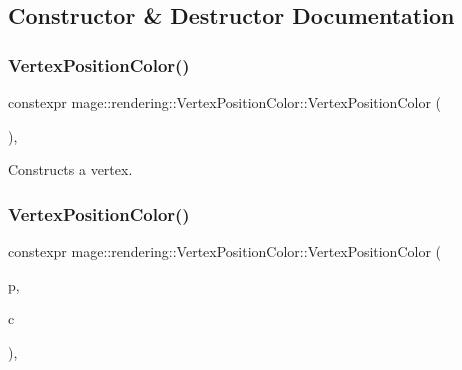\subsection{Constructor \& Destructor Documentation}
\hypertarget{structmage_1_1rendering_1_1_vertex_position_color_a2491463aecd8969ed33f85b41a0887c5}{}\label{structmage_1_1rendering_1_1_vertex_position_color_a2491463aecd8969ed33f85b41a0887c5} 
\subsubsection{\texorpdfstring{Vertex\+Position\+Color()}{VertexPositionColor()}\hspace{0.1cm}{\footnotesize\ttfamily [1/4]}}
{\footnotesize\ttfamily constexpr mage\+::rendering\+::\+Vertex\+Position\+Color\+::\+Vertex\+Position\+Color (\begin{DoxyParamCaption}{ }\end{DoxyParamCaption})\hspace{0.3cm}{\ttfamily [default]}, {\ttfamily [noexcept]}}

Constructs a vertex. \hypertarget{structmage_1_1rendering_1_1_vertex_position_color_aee4b12660a3966ebbaf8235eadf0295a}{}\label{structmage_1_1rendering_1_1_vertex_position_color_aee4b12660a3966ebbaf8235eadf0295a} 
\subsubsection{\texorpdfstring{Vertex\+Position\+Color()}{VertexPositionColor()}\hspace{0.1cm}{\footnotesize\ttfamily [2/4]}}
{\footnotesize\ttfamily constexpr mage\+::rendering\+::\+Vertex\+Position\+Color\+::\+Vertex\+Position\+Color (\begin{DoxyParamCaption}\item[{\hyperlink{structmage_1_1_point3}{Point3}}]{p,  }\item[{\hyperlink{structmage_1_1_r_g_b_a}{R\+G\+BA}}]{c }\end{DoxyParamCaption})\hspace{0.3cm}{\ttfamily [explicit]}, {\ttfamily [noexcept]}}

